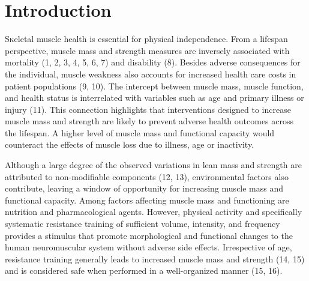 \documentclass[twoside,10pt]{gihclass} %
\begin{document}
  \hypersetup{linkcolor=black}
  \setcounter{tocdepth}{2}
  \tableofcontents

  \listoftables

  \listoffigures




\mainmatter %
\pagestyle{fancyplain} %

\setcounter{DefaultLines}{3}

\hypertarget{introduction}{%
\chapter{Introduction}\label{introduction}}

\lettrine{S}keletal muscle health is essential for physical independence. From a lifespan perspective, muscle mass and strength measures are inversely associated with mortality
(1, 2, 3, 4, 5, 6, 7)
and disability
(8).
Besides adverse consequences for the individual, muscle weakness also accounts for increased health care costs in patient populations
(9, 10).
The intercept between muscle mass, muscle function, and health status is interrelated with variables such as age and primary illness or injury
(11).
This connection highlights that interventions designed to increase muscle mass and strength are likely to prevent adverse health outcomes across the lifespan. A higher level of muscle mass and functional capacity would counteract the effects of muscle loss due to illness, age or inactivity.

Although a large degree of the observed variations in lean mass and strength are attributed to non-modifiable components
(12, 13),
environmental factors also contribute, leaving a window of opportunity for increasing muscle mass and functional capacity. Among factors affecting muscle mass and functioning are nutrition and pharmacological agents. However, physical activity and specifically systematic resistance training of sufficient volume, intensity, and frequency provides a stimulus that promote morphological and functional changes to the human neuromuscular system without adverse side effects. Irrespective of age, resistance training generally leads to increased muscle mass and strength
(14, 15)
and is considered safe when performed in a well-organized manner
(15, 16).
\end{document}
